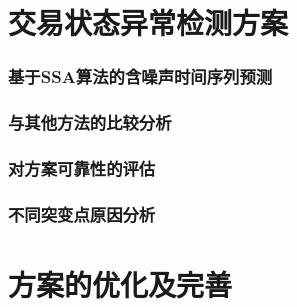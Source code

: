 \documentclass[a4paper]{article}
\begin{document}
\part{交易状态异常检测方案}
\section{基于SSA算法的含噪声时间序列预测}
\section{与其他方法的比较分析}
\section{对方案可靠性的评估}
\section{不同突变点原因分析}

\part{方案的优化及完善}
\end{document}
